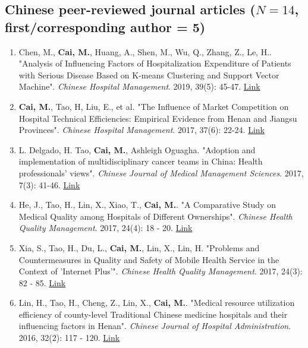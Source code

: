 \documentclass[11pt, a4paper]{article}
\newcommand{\years}[1]{\marginnote{\scriptsize #1}}
\begin{document}
	
	
	\subsection*{Chinese peer-reviewed journal articles ($N=14$, first/corresponding author = 5)}
	\begin{enumerate}[leftmargin=0ex,itemsep=1ex]
		\item \years{2019}Chen, M., \textbf{Cai, M.}, Huang, A., Shen, M., Wu, Q., Zhang, Z., Le, H.. "Analysis of Influencing Factors of Hospitalization Expenditure of Patients with Serious Disease Based on K-means Clustering and Support Vector Machine". \emph{Chinese Hospital Management}. 2019, 39(5): 45-47. \href{http://d.old.wanfangdata.com.cn/Periodical/zgyygl201905018}{Link}
		
		\item \years{2017}\textbf{Cai, 	M.}, Tao, H, Liu, E., et al. "The Influence of Market Competition on Hospital Technical Efficiencies: Empirical Evidence from Henan and Jiangsu Provinces". \emph{Chinese Hospital Management}. 2017, 37(6): 22-24. \href{http://www.cnki.com.cn/Article/CJFDTotal-YYGL201706012.htm}{Link}
		
		\item L. Delgado, H. Tao, \textbf{Cai, M.}, Ashleigh Oguagha. "Adoption and implementation of multidisciplinary cancer teams in China: Health professionals’ views". \emph{Chinese Journal of Medical Management Sciences}. 2017, 7(3): 41-46. \href{http://www.cnki.com.cn/Article/CJFDTOTAL-YLGL201703008.htm}{Link}
		
		\item He, J., Tao, H., Lin, X., Xiao, T., \textbf{Cai, M.}. "A Comparative Study on Medical Quality among Hospitals of Different Ownerships". \emph{Chinese Health Quality Management}. 2017, 24(4): 18 - 20. \href{http://www.cnki.com.cn/Article/CJFDTOTAL-WSJG201704010.htm}{Link}
		
		\item Xia, S., Tao, H., Du, L., \textbf{Cai, M.}, Lin, X., Lin, H. "Problems and Countermeasures in Quality and Safety of Mobile Health Service in the Context of 'Internet Plus'". \emph{Chinese Health Quality Management}. 2017, 24(3): 82 - 85. \href{http://www.cnki.com.cn/Article/CJFDTOTAL-WSJG201703030.htm}{Link}
		
		\item \years{2016}Lin, H., Tao, H., Cheng, Z., Lin, X., \textbf{Cai, M.}. "Medical resource utilization efficiency of county-level Traditional Chinese medicine hospitals and their influencing factors in Henan". \emph{Chinese Journal of Hospital Administration}. 2016, 32(2): 117 - 120. \href{http://xuewen.cnki.net/CMFD-1016781136.nh.html}{Link}
		

\end{enumerate}
\end{document}
